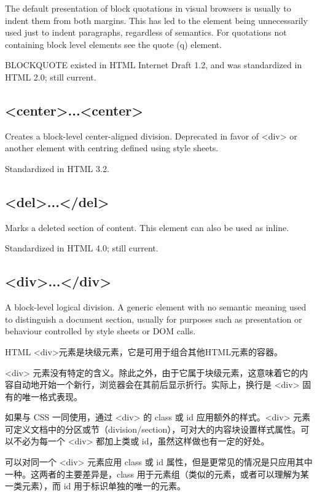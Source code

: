 The default presentation of block quotations in visual browsers is usually to indent them from both margins. This has led to the element being unnecessarily used just to indent paragraphs, regardless of semantics. For quotations not containing block level elements see the quote (q) element.

BLOCKQUOTE existed in HTML Internet Draft 1.2, and was standardized in HTML 2.0; still current. 




\subsection{<center>...<center>}


Creates a block-level center-aligned division. Deprecated in favor of <div> or another element with centring defined using style sheets.

Standardized in HTML 3.2.


\subsection{<del>...</del>}

Marks a deleted section of content. This element can also be used as inline.

Standardized in HTML 4.0; still current.







\subsection{<div>...</div>}

A block-level logical division. A generic element with no semantic meaning used to distinguish a document section, usually for purposes such as presentation or behaviour controlled by style sheets or DOM calls.

HTML <div>元素是块级元素，它是可用于组合其他HTML元素的容器。

<div> 元素没有特定的含义。除此之外，由于它属于块级元素，这意味着它的内容自动地开始一个新行，浏览器会在其前后显示折行。实际上，换行是 <div> 固有的唯一格式表现。


如果与 CSS 一同使用，通过 <div> 的 class 或 id 应用额外的样式。<div> 元素可定义文档中的分区或节（division/section），可对大的内容块设置样式属性。可以不必为每一个 <div> 都加上类或 id，虽然这样做也有一定的好处。

可以对同一个 <div> 元素应用 class 或 id 属性，但是更常见的情况是只应用其中一种。这两者的主要差异是，class 用于元素组（类似的元素，或者可以理解为某一类元素），而 id 用于标识单独的唯一的元素。



